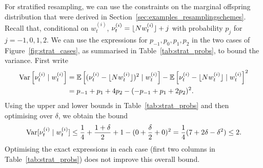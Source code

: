 For stratified resampling, we can use the constraints on the marginal offspring distribution that were derived in Section~\ref{sec:examples_resamplingschemes}. Recall that, conditional on $w_t^{(i)}$, $\nu_t^{(i)} = \lfloor N w_t^{(i)} \rfloor + j$ with probability $p_{j}$ for $j=-1,0,1,2$.
We can use the expressions for $p_{-1},p_0,p_1,p_2$ in the two cases of Figure~\ref{fig:strat_cases}, as summarised in Table~\ref{tab:strat_probs}, to bound the variance. First write
\begin{align}
\operatorname{Var}\left[ \nu_t^{(i)} \mid w_t^{(i)} \right]
&= \mathbb{E}\left[ (\nu_t^{(i)} - \lfloor N w_t^{(i)} \rfloor)^2 \mid w_t^{(i)} \right] 
        - \mathbb{E}\left[ \nu_t^{(i)} -\lfloor N w_t^{(i)} \rfloor \mid w_t^{(i)} \right]^2 \notag\\
&= p_{-1} + p_1 + 4p_2 - (-p_{-1} + p_1 + 2p_2)^2 . \label{eq:marg_var_strat}
\end{align}
Using the upper and lower bounds in Table~\ref{tab:strat_probs} and then optimising over $\delta$, we obtain the bound
\begin{equation*}
\operatorname{Var}[ \nu_t^{(i)} \mid w_t^{(i)} ]
\leq \frac{1}{4} + \frac{1+\delta}{2} + 1 - ( 0 + \frac{\delta}{2} + 0 )^2
=\frac{1}{4}(7 + 2\delta - \delta^2)
\leq 2 .
\end{equation*}
Optimising the exact expressions in each case (first two columns in Table~\ref{tab:strat_probs}) does not improve this overall bound.

